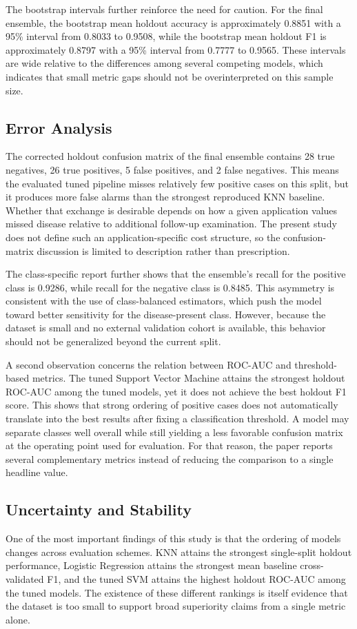\documentclass[conference]{IEEEtran}
\begin{document}
The bootstrap intervals further reinforce the need for caution. For the final ensemble, the bootstrap mean holdout accuracy is approximately 0.8851 with a 95\% interval from 0.8033 to 0.9508, while the bootstrap mean holdout F1 is approximately 0.8797 with a 95\% interval from 0.7777 to 0.9565. These intervals are wide relative to the differences among several competing models, which indicates that small metric gaps should not be overinterpreted on this sample size.

\subsection{Error Analysis}
The corrected holdout confusion matrix of the final ensemble contains 28 true negatives, 26 true positives, 5 false positives, and 2 false negatives. This means the evaluated tuned pipeline misses relatively few positive cases on this split, but it produces more false alarms than the strongest reproduced KNN baseline. Whether that exchange is desirable depends on how a given application values missed disease relative to additional follow-up examination. The present study does not define such an application-specific cost structure, so the confusion-matrix discussion is limited to description rather than prescription.

The class-specific report further shows that the ensemble's recall for the positive class is 0.9286, while recall for the negative class is 0.8485. This asymmetry is consistent with the use of class-balanced estimators, which push the model toward better sensitivity for the disease-present class. However, because the dataset is small and no external validation cohort is available, this behavior should not be generalized beyond the current split.

A second observation concerns the relation between ROC-AUC and threshold-based metrics. The tuned Support Vector Machine attains the strongest holdout ROC-AUC among the tuned models, yet it does not achieve the best holdout F1 score. This shows that strong ordering of positive cases does not automatically translate into the best results after fixing a classification threshold. A model may separate classes well overall while still yielding a less favorable confusion matrix at the operating point used for evaluation. For that reason, the paper reports several complementary metrics instead of reducing the comparison to a single headline value.

\subsection{Uncertainty and Stability}
One of the most important findings of this study is that the ordering of models changes across evaluation schemes. KNN attains the strongest single-split holdout performance, Logistic Regression attains the strongest mean baseline cross-validated F1, and the tuned SVM attains the highest holdout ROC-AUC among the tuned models. The existence of these different rankings is itself evidence that the dataset is too small to support broad superiority claims from a single metric alone.
\end{document}
